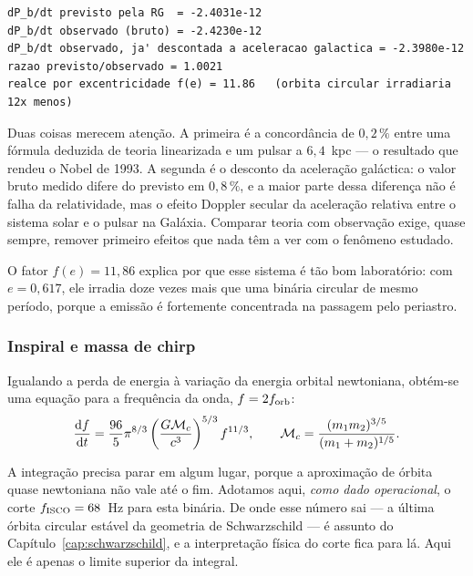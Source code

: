 \begin{saida}
\begin{lstlisting}[style=rgsaida]
dP_b/dt previsto pela RG  = -2.4031e-12
dP_b/dt observado (bruto) = -2.4230e-12
dP_b/dt observado, ja' descontada a aceleracao galactica = -2.3980e-12
razao previsto/observado = 1.0021
realce por excentricidade f(e) = 11.86   (orbita circular irradiaria 12x menos)
\end{lstlisting}
\end{saida}

Duas coisas merecem atenção. A primeira é a concordância de $0{,}2\,\%$ entre
uma fórmula deduzida de teoria linearizada e um pulsar a $6{,}4$~kpc --- o
resultado que rendeu o Nobel de 1993. A segunda é o desconto da aceleração
galáctica: o valor bruto medido difere do previsto em $0{,}8\,\%$, e a maior
parte dessa diferença não é falha da relatividade, mas o efeito Doppler
secular da aceleração relativa entre o sistema solar e o pulsar na Galáxia.
Comparar teoria com observação exige, quase sempre, remover primeiro efeitos
que nada têm a ver com o fenômeno estudado.

O fator $f(e) = 11{,}86$ explica por que esse sistema é tão bom laboratório:
com $e = 0{,}617$, ele irradia doze vezes mais que uma binária circular de
mesmo período, porque a emissão é fortemente concentrada na passagem pelo
periastro.

\subsubsection*{Inspiral e massa de chirp}

Igualando a perda de energia à variação da energia orbital newtoniana,
obtém-se uma equação para a frequência da onda, $f = 2f_{\rm orb}$:
\begin{equation}
  \frac{\mathrm{d} f}{\mathrm{d} t} = \frac{96}{5}\pi^{8/3}
  \left(\frac{G\mathcal{M}_{c}}{c^{3}}\right)^{5/3} f^{11/3},
  \qquad
  \mathcal{M}_{c} = \frac{(m_{1}m_{2})^{3/5}}{(m_{1}+m_{2})^{1/5}}.
  \label{eq:cap10-chirp}
\end{equation}

A integração precisa parar em algum lugar, porque a aproximação de órbita
quase newtoniana não vale até o fim. Adotamos aqui, \emph{como dado
operacional}, o corte $f_{\rm ISCO}=68$~Hz para esta binária. De onde esse
número sai --- a última órbita circular estável da geometria de
Schwarzschild --- é assunto do Capítulo~\ref{cap:schwarzschild}, e a
interpretação física do corte fica para lá. Aqui ele é apenas o limite
superior da integral.

